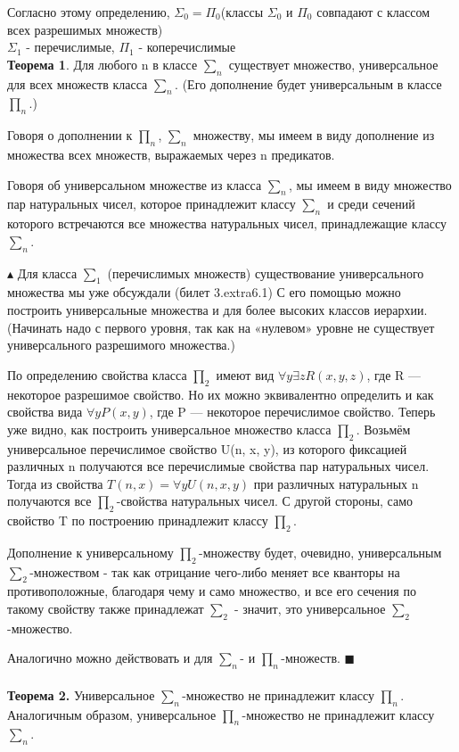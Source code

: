 Согласно этому определению, $\Sigma_0 = \Pi_0$(классы $\Sigma_0$ и $\Pi_0$ совпадают с классом всех разрешимых множеств)
\\
$\Sigma_1$ - перечислимые, $\Pi_1$ - коперечислимые
\\

\textbf{Теорема 1}. Для любого n в классе $\sum_n$ существует множество,
универсальное для всех множеств класса $\sum_n$. (Его дополнение будет
универсальным в классе $\prod_n$.)

Говоря о дополнении к $\prod_n$, $\sum_n$  множеству, мы имеем в виду дополнение из множества всех множеств, выражаемых через n предикатов.

Говоря об универсальном множестве из класса $\sum_n$, мы имеем в виду множество пар натуральных чисел, которое принадлежит классу $\sum_n$ и среди сечений которого встречаются все множества натуральных чисел, принадлежащие классу $\sum_n$.

$\blacktriangle$
Для класса $\sum_1$ (перечислимых множеств) существование универсального множества мы уже обсуждали (билет 3.extra6.1) С его помощью можно построить универсальные множества и для более высоких классов иерархии. (Начинать надо с первого уровня, так как на «нулевом» уровне не существует универсального разрешимого множества.)

По определению свойства класса $\prod_2$ имеют вид $\forall y\exists z R(x, y, z)$,
где R — некоторое разрешимое свойство. Но их можно эквивалентно определить и как свойства вида $\forall y P(x, y)$, где P — некоторое перечислимое свойство. Теперь уже видно, как построить универсальное множество класса $\prod_2$. Возьмём универсальное перечислимое свойство U(n, x, y), из которого фиксацией различных n получаются все перечислимые свойства пар натуральных чисел. Тогда из свойства $T(n, x) = \forall y U(n, x, y)$ при различных натуральных n получаются все $\prod_2$-свойства натуральных чисел. С другой стороны, само свойство T по построению принадлежит классу $\prod_2$.

Дополнение к универсальному $\prod_2$-множеству будет, очевидно, универсальным $\sum_2$-множеством - так как отрицание чего-либо меняет все кванторы на противоположные, благодаря чему и само множество, и все его сечения по такому свойству также принадлежат $\sum_2$ - значит, это универсальное $\sum_2$-множество.

Аналогично можно действовать и для $\sum_n$- и $\prod_n$-множеств.
$\blacksquare$ \\
\\
\textbf{Теорема 2.} Универсальное $\sum_n$-множество не принадлежит классу $\prod_n$. Аналогичным образом, универсальное $\prod_n$-множество не принадлежит классу $\sum_n$.

